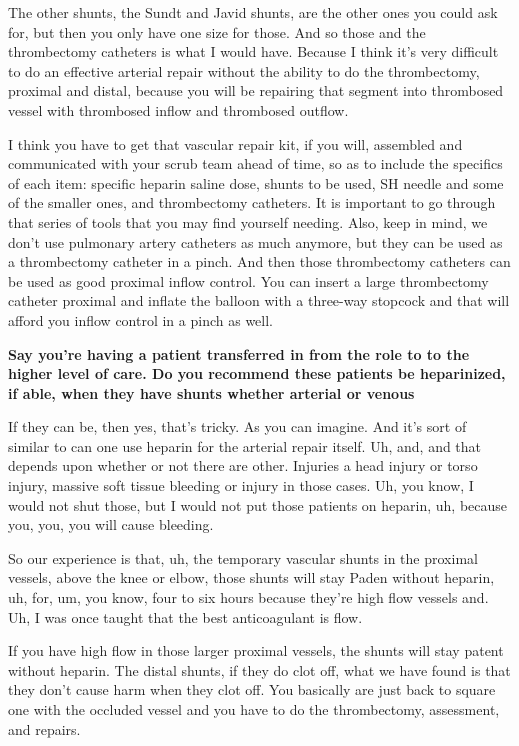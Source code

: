 \documentclass[
]{book}
\begin{document}
The other shunts, the Sundt and Javid shunts, are the other ones you
could ask for, but then you only have one size for those. And so those
and the thrombectomy catheters is what I would have. Because I think
it's very difficult to do an effective arterial repair without the
ability to do the thrombectomy, proximal and distal, because you will be
repairing that segment into thrombosed vessel with thrombosed inflow and
thrombosed outflow.

I think you have to get that vascular repair kit, if you will, assembled
and communicated with your scrub team ahead of time, so as to include
the specifics of each item: specific heparin saline dose, shunts to be
used, SH needle and some of the smaller ones, and thrombectomy
catheters. It is important to go through that series of tools that you
may find yourself needing. Also, keep in mind, we don't use pulmonary
artery catheters as much anymore, but they can be used as a thrombectomy
catheter in a pinch. And then those thrombectomy catheters can be used
as good proximal inflow control. You can insert a large thrombectomy
catheter proximal and inflate the balloon with a three-way stopcock and
that will afford you inflow control in a pinch as well.

\textbf{Say you're having a patient transferred in from the role to to the
higher level of care. Do you recommend these patients be heparinized, if
able, when they have shunts whether arterial or venous}

If they can be, then yes, that's tricky. As you can imagine. And it's
sort of similar to can one use heparin for the arterial repair itself.
Uh, and, and that depends upon whether or not there are other. Injuries
a head injury or torso injury, massive soft tissue bleeding or injury in
those cases. Uh, you know, I would not shut those, but I would not put
those patients on heparin, uh, because you, you, you will cause
bleeding.

So our experience is that, uh, the temporary vascular shunts in the
proximal vessels, above the knee or elbow, those shunts will stay Paden
without heparin, uh, for, um, you know, four to six hours because
they're high flow vessels and. Uh, I was once taught that the best
anticoagulant is flow.

If you have high flow in those larger proximal vessels, the shunts will
stay patent without heparin. The distal shunts, if they do clot off,
what we have found is that they don't cause harm when they clot off. You
basically are just back to square one with the occluded vessel and you
have to do the thrombectomy, assessment, and repairs.
\end{document}

